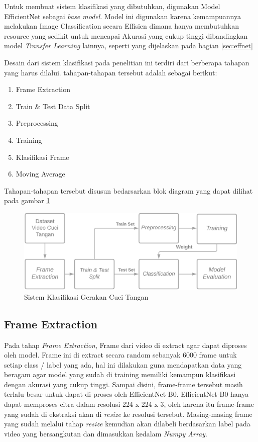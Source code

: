 Untuk membuat sistem klasifikasi yang dibutuhkan, digunakan Model EfficientNet sebagai \textit{base model}. Model ini digunakan karena kemampuannya melakukan Image Classification secara Effisien dimana hanya membutuhkan resource yang sedikit untuk mencapai Akurasi yang cukup tinggi dibandingkan model \textit{Transfer Learning} lainnya, seperti yang dijelaskan pada bagian \ref{sec:effnet}

Desain dari sistem klasifikasi pada penelitian ini terdiri dari berberapa tahapan yang harus dilalui. tahapan-tahapan tersebut adalah sebagai berikut:

\newpage
\begin{enumerate}[nolistsep]
	\item Frame Extraction
	\item Train \& Test Data Split
	\item Preprocessing
	\item Training
	\item Klasifikasi Frame
	\item Moving Average
\end{enumerate}

Tahapan-tahapan tersebut disusun bedarsarkan blok diagram yang dapat dilihat pada gambar \ref{fig:klasifikasi}

\begin{figure}[!ht]
	\centering
	\includegraphics[width=1\columnwidth]{gambar/modelklasifikasi.png}
	\caption{Sistem Klasifikasi Gerakan Cuci Tangan}
	\label{fig:klasifikasi}
\end{figure}

\subsection{Frame Extraction}
\label{subsec:framextraction}

Pada tahap \textit{Frame Extraction}, Frame dari video di extract agar dapat diproses oleh model. Frame ini di extract secara random sebanyak 6000 frame untuk setiap class / label yang ada, hal ini dilakukan guna mendapatkan data yang beragam agar model yang sudah di training memiliki kemampun klasifikasi dengan akurasi yang cukup tinggi. Sampai disini, frame-frame tersebut masih terlalu besar untuk dapat di proses oleh EfficientNet-B0. EfficientNet-B0 hanya dapat memproses citra dalam resolusi 224 x 224 x 3, oleh karena itu frame-frame yang sudah di ekstraksi akan di \textit{resize} ke resolusi tersebut. Masing-masing frame yang sudah melalui tahap \textit{resize} kemudian akan dilabeli berdasarkan label pada video yang bersangkutan dan dimasukkan kedalam \textit{Numpy Array}.


